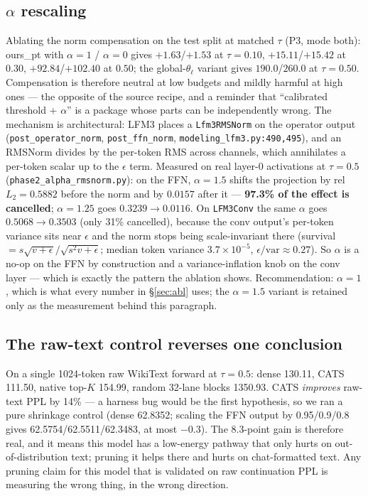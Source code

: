\documentclass[11pt]{article}
\newcommand{\thetal}{\theta_\ell}
\newcommand{\code}[1]{\texttt{\small #1}}
\begin{document}
\subsection{$\alpha$ rescaling}\label{sec:alpha}
Ablating the norm compensation on the test split at matched $\tau$ (P3, mode both):
ours\_pt with $\alpha{=}1$ / $\alpha{=}0$ gives $+1.63$/$+1.53$ at $\tau{=}0.10$,
$+15.11$/$+15.42$ at $0.30$, $+92.84$/$+102.40$ at $0.50$; the global-$\thetal$ variant
gives $190.0$/$260.0$ at $\tau{=}0.50$. Compensation is therefore neutral at low budgets
and mildly harmful at high ones --- the opposite of the source recipe, and a reminder that
``calibrated threshold + $\alpha$'' is a package whose parts can be independently wrong.
The mechanism is architectural: LFM3 places a \code{Lfm3RMSNorm} on the operator output
(\code{post\_operator\_norm}, \code{post\_ffn\_norm}, \code{modeling\_lfm3.py:490,495}),
and an RMSNorm divides by the per-token RMS across channels, which annihilates a per-token
scalar up to the $\epsilon$ term. Measured on real layer-0 activations at $\tau{=}0.5$
(\code{phase2\_alpha\_rmsnorm.py}): on the FFN, $\alpha{=}1.5$ shifts the projection by
rel $L_2=0.5882$ before the norm and by $0.0157$ after it --- \textbf{97.3\% of the effect
is cancelled}; $\alpha{=}1.25$ goes $0.3239\to0.0116$. On \code{LFM3Conv} the same
$\alpha$ goes $0.5068\to0.3503$ (only 31\% cancelled), because the conv output's
per-token variance sits near $\epsilon$ and the norm stops being scale-invariant there
(survival $=s\sqrt{v+\epsilon}/\sqrt{s^{2}v+\epsilon}$; median token variance
$3.7\times10^{-5}$, $\epsilon/\mathrm{var}\approx0.27$). So $\alpha$ is a no-op on the
FFN by construction and a variance-inflation knob on the conv layer --- which is exactly
the pattern the ablation shows. Recommendation: $\alpha{=}1$, which is what every
number in \S\ref{sec:abl} uses; the $\alpha{=}1.5$ variant is retained only as the
measurement behind this paragraph.

\subsection{The raw-text control reverses one conclusion}\label{sec:ood}
On a single 1024-token raw WikiText forward at $\tau{=}0.5$: dense 130.11, CATS 111.50,
native top-$K$ 154.99, random 32-lane blocks 1350.93. CATS \emph{improves} raw-text PPL by
14\% --- a harness bug would be the first hypothesis, so we ran a pure shrinkage control
(dense 62.8352; scaling the FFN output by 0.95/0.9/0.8 gives 62.5754/62.5511/62.3483, at
most $-0.3$). The 8.3-point gain is therefore real, and it means this model has a
low-energy pathway that only hurts on out-of-distribution text; pruning it helps there and
hurts on chat-formatted text. Any pruning claim for this model that is validated on raw
continuation PPL is measuring the wrong thing, in the wrong direction.
\end{document}
